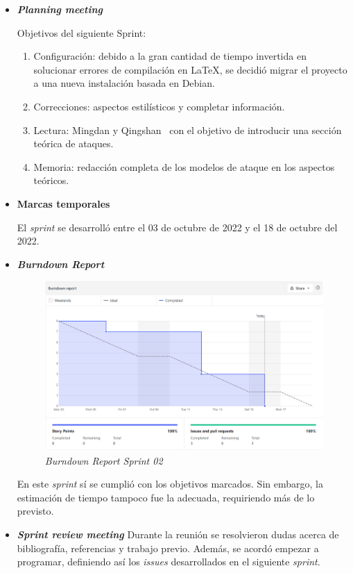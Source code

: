 \begin{itemize}
	\item \textbf{\textit{Planning meeting}}
	
	Objetivos del siguiente Sprint:
	
	\begin{enumerate}
		
		\item Configuración: debido a la gran cantidad de tiempo invertida en solucionar errores de compilación en \LaTeX{}, se decidió migrar el proyecto a una nueva instalación basada en Debian.
		\item Correcciones: aspectos estilísticos y completar información.
		\item Lectura: Mingdan y Qingshan~\cite{mingdan2018ShillingAttacksAReview} con el objetivo de introducir una sección teórica de ataques.
		\item Memoria: redacción completa de los modelos de ataque en los aspectos teóricos.
		
	\end{enumerate}
	
	\item \textbf{Marcas temporales}
	
	El \textit{sprint} se desarrolló entre el 03 de octubre de 2022 y el 18 de octubre del 2022.
	
	\item \textbf{\textit{Burndown Report}}
	
	\begin{figure}[h]
		\caption{\textit{Burndown Report Sprint 02}}
		\centering
		\includegraphics[width=\textwidth]{../img/anexos/s02_bdr}
	\end{figure}
		
	En este \textit{sprint} sí se cumplió con los objetivos marcados. Sin embargo, la estimación de tiempo tampoco fue la adecuada, requiriendo más de lo previsto.
	
	\item \textbf{\textit{Sprint review meeting}}
	Durante la reunión se resolvieron dudas acerca de bibliografía, referencias y trabajo previo. Además, se acordó empezar a programar, definiendo así los \textit{issues} desarrollados en el siguiente \textit{sprint}.
	
\end{itemize}

